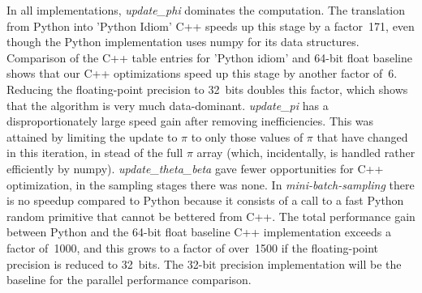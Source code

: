 In all implementations, \textit{update\_phi} dominates the computation.
The translation from Python into 'Python Idiom' C++ speeds up this stage
by a factor~171, even though the Python implementation uses numpy for its data
structures. Comparison of the C++ table entries for 'Python idiom' and
64-bit float baseline shows that our C++ optimizations speed up this stage
by another factor of~6. Reducing the floating-point precision to 32~bits
doubles this factor, which shows that the algorithm is very much data-dominant.
%
\textit{update\_pi} has a disproportionately large speed
gain after removing inefficiencies. This was attained by limiting the
update to $\pi$ to only those values of $\pi$ that have changed in this
iteration, in stead of the full $\pi$ array (which, incidentally, is handled
rather efficiently by numpy).
\textit{update\_theta\_beta} gave fewer opportunities for C++ optimization,
in the sampling stages there was none. In \textit{mini-batch-sampling} there
is no speedup compared to Python because it consists of a call to
a fast Python random primitive that cannot be bettered from C++.
The total performance gain between Python and the 64-bit float baseline C++
implementation exceeds a factor of~1000, and this grows to a factor of over~1500
if the floating-point precision is reduced to 32~bits. The 32-bit precision
implementation will be the baseline for the parallel performance comparison.

\begin{comment}
The introduction of a custom user-space random generator brings at most
a very small
benefit. We show it, because it is necessary for the multi-threaded
implementations described in the next section, and this measurement serves to
prove that it does not harm execution speed.
\end{comment}
